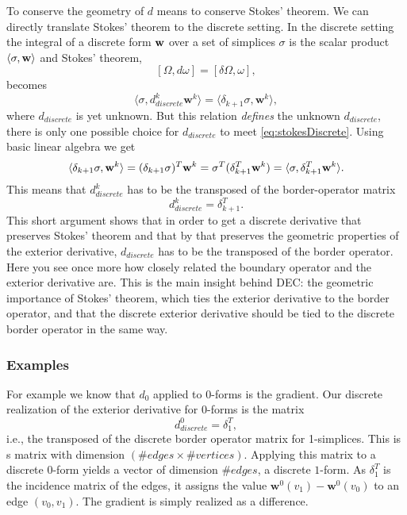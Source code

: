 To conserve the geometry of $d$ means to conserve Stokes' theorem.  We can directly translate Stokes' theorem to the discrete setting. In the discrete setting the integral of a discrete form $\textbf{w}$ over a set of simplices $\sigma$ is the scalar product $\langle \sigma, \textbf{w} \rangle$ and Stokes' theorem,
\[[\Omega,d\omega] = [\delta \Omega, \omega],\]
becomes
\begin{equation}\langle \sigma, d_{discrete}^k\textbf{w}^k \rangle = \langle \delta_{k+1} \sigma, \textbf{w}^k \rangle,\label{eq:stokesDiscrete}\end{equation}
where $d_{discrete}$ is yet unknown. But this relation \emph{defines} the unknown $d_{discrete}$, there is only one possible choice for $d_{discrete}$ to meet \ref{eq:stokesDiscrete}. Using basic linear algebra we get
\[\langle \delta_{k+1}\sigma, \textbf{w}^k \rangle = (\delta_{k+1}\sigma)^T \textbf{w}^k =  \sigma^T (\delta_{k+1}^T \textbf{w}^k) = \langle \sigma , \delta_{k+1}^T \textbf{w}^k \rangle. \]
This means that $d_{discrete}^k$ has to be the transposed of the border-operator matrix  
\[d_{discrete}^k = \delta_{k+1}^T.\]
This short argument shows that in order to get a discrete derivative that preserves Stokes' theorem and that by that preserves the geometric properties of the exterior derivative, $d_{discrete}$ has to be the transposed of the border operator. Here you see once more how closely related the boundary operator and the exterior derivative are. This is the main insight behind DEC: the geometric importance of Stokes' theorem, which ties the exterior derivative to the border operator, and that the discrete exterior derivative should be tied to the discrete border operator in the same way.


\subsubsection{Examples}

For example we know that $d_0$ applied to $0$-forms is the gradient. Our discrete realization of the exterior derivative for $0$-forms is the matrix
\[d_{discrete}^0 = \delta_1^T,\]
i.e., the transposed of the discrete border operator matrix for 1-simplices. This is s matrix with dimension $(\# edges \times \#vertices)$. Applying this matrix to a discrete $0$-form yields a vector of dimension $\# edges$, a discrete $1$-form. As $\delta_1^T$ is the incidence matrix of the edges, it assigns the value $\textbf{w}^0(v_1) - \textbf{w}^0(v_0)$ to an edge $(v_0,v_1)$. The gradient is simply realized as a difference.

